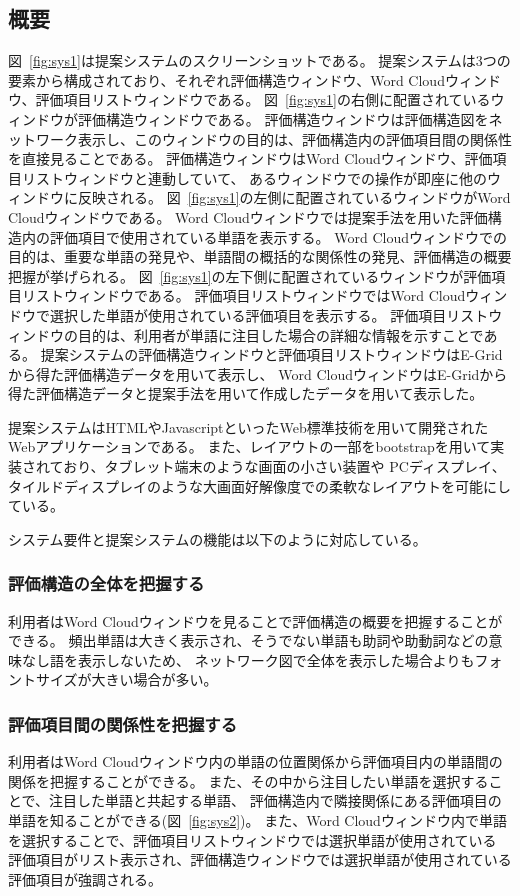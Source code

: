 \documentclass[syuuron]{kuee}
\begin{document}
		\subsection{概要}
			図~\ref{fig:sys1}は提案システムのスクリーンショットである。
			提案システムは3つの要素から構成されており、それぞれ評価構造ウィンドウ、Word Cloudウィンドウ、評価項目リストウィンドウである。
			図~\ref{fig:sys1}の右側に配置されているウィンドウが評価構造ウィンドウである。
			評価構造ウィンドウは評価構造図をネットワーク表示し、このウィンドウの目的は、評価構造内の評価項目間の関係性を直接見ることである。
			評価構造ウィンドウはWord Cloudウィンドウ、評価項目リストウィンドウと連動していて、
			あるウィンドウでの操作が即座に他のウィンドウに反映される。
			図~\ref{fig:sys1}の左側に配置されているウィンドウがWord Cloudウィンドウである。
			Word Cloudウィンドウでは提案手法を用いた評価構造内の評価項目で使用されている単語を表示する。
			Word Cloudウィンドウでの目的は、重要な単語の発見や、単語間の概括的な関係性の発見、評価構造の概要把握が挙げられる。
			図~\ref{fig:sys1}の左下側に配置されているウィンドウが評価項目リストウィンドウである。
			評価項目リストウィンドウではWord Cloudウィンドウで選択した単語が使用されている評価項目を表示する。
			評価項目リストウィンドウの目的は、利用者が単語に注目した場合の詳細な情報を示すことである。
			提案システムの評価構造ウィンドウと評価項目リストウィンドウはE-Gridから得た評価構造データを用いて表示し、
			Word CloudウィンドウはE-Gridから得た評価構造データと提案手法を用いて作成したデータを用いて表示した。
			
			提案システムはHTMLやJavascriptといったWeb標準技術を用いて開発されたWebアプリケーションである。
			また、レイアウトの一部をbootstrapを用いて実装されており、タブレット端末のような画面の小さい装置や
			PCディスプレイ、タイルドディスプレイのような大画面好解像度での柔軟なレイアウトを可能にしている。
			
			システム要件と提案システムの機能は以下のように対応している。
			\subsubsection{評価構造の全体を把握する}
				利用者はWord Cloudウィンドウを見ることで評価構造の概要を把握することができる。
				頻出単語は大きく表示され、そうでない単語も助詞や助動詞などの意味なし語を表示しないため、
				ネットワーク図で全体を表示した場合よりもフォントサイズが大きい場合が多い。				
			\subsubsection{評価項目間の関係性を把握する}
				利用者はWord Cloudウィンドウ内の単語の位置関係から評価項目内の単語間の関係を把握することができる。
				また、その中から注目したい単語を選択することで、注目した単語と共起する単語、
				評価構造内で隣接関係にある評価項目の単語を知ることができる(図~\ref{fig:sys2})。
				また、Word Cloudウィンドウ内で単語を選択することで、評価項目リストウィンドウでは選択単語が使用されている
				評価項目がリスト表示され、評価構造ウィンドウでは選択単語が使用されている
				評価項目が強調される。
\end{document}
